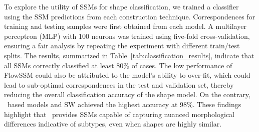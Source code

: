 To explore the utility of SSMs for shape classification, we trained a classifier using the SSM predictions from each construction technique. Correspondences for training and testing samples were first obtained from each model. A multilayer perceptron (MLP) with 100 neurons was trained using five-fold cross-validation, ensuring a fair analysis by repeating the experiment with different train/test splits. The results, summarized in Table~\ref{tab:classification_results}, indicate that all SSMs correctly classified at least 80\% of cases. The low performance of FlowSSM could also be attributed to the model's ability to over-fit, which could lead to sub-optimal correspondences in the test and validation set, thereby reducing the overall classification accuracy of the shape model. On the contrary, \model~based models and SW achieved the highest accuracy at 98\%. These findings highlight that \model~provides SSMs capable of capturing nuanced morphological differences indicative of subtypes, even when shapes are highly similar.






